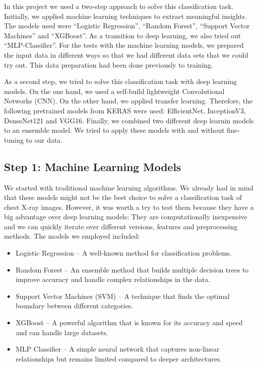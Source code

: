 \documentclass{article}
\begin{document}
In this project we used a two-step approach to solve this classification task. Initially, we applied machine learning techniques to extract meaningful insights. The models used were “Logistic Regression”, “Random Forest”, “Support Vector Machines” and “XGBoost”. As a transition to deep learning, we also tried out “MLP-Classifier”. For the tests with the machine learning models, we prepared the input data in different ways so that we had different data sets that we could try out. This data preparation had been done previously to training. 

As a second step, we tried to solve this classification task with deep learning models. On the one hand, we used a self-build lightweight Convolutional Networks (CNN). On the other hand, we applied transfer learning. Therefore, the following pretrained models from KERAS were used: EfficientNet, InceptionV3, DenseNet121 and VGG16. Finally, we combined two different deep learnin models to an ensemble model. We tried to apply these models with and without fine-tuning to our data. 


\subsection{Step 1: Machine Learning Models}
We started with traditional machine learning algorithms. We already had in mind that these models might not be the best choice to solve a classification task of chest X-ray images. However, it was worth a try to test them because they have a big advantage over deep learning models: They are computationally inexpensive and we can quickly iterate over different versions, features and preprocessing methods. The models we employed included:

\begin{itemize}
    \item Logistic Regression – A well-known method for classification problems.
    \item Random Forest – An ensemble method that builds multiple decision trees to improve accuracy and handle complex relationships in the data.
    \item Support Vector Machines (SVM) – A technique that finds the optimal boundary between different categories.
    \item XGBoost – A powerful algorithm that is known for its accuracy and speed and can handle large datasets.
    \item MLP Classifier – A simple neural network that captures non-linear relationships but remains limited compared to deeper architectures.
\end{itemize}
\end{document}
